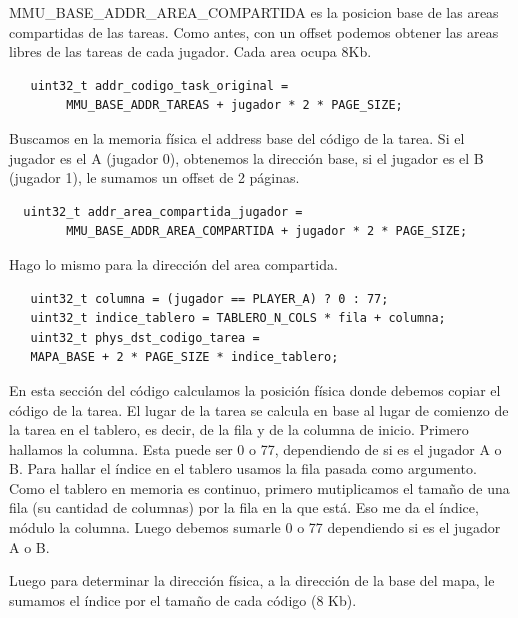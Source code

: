 \documentclass[a4paper]{article}
\newenvironment{codesnippet}{%
	\begin{Sbox}\begin{minipage}{\textwidth}\sffamily\small}%
	{\end{minipage}\end{Sbox}%
		\begin{center}%
		\vspace{-0.4cm}\colorbox{litegrey}{\TheSbox}\end{center}\vspace{0.3cm}}
\begin{document}
MMU\_BASE\_ADDR\_AREA\_COMPARTIDA es la posicion base de las areas compartidas de las tareas. Como antes, con un offset
podemos obtener las areas libres de las tareas de cada jugador. Cada area ocupa 8Kb.

\begin{codesnippet}
  \begin{verbatim}
   uint32_t addr_codigo_task_original =
        MMU_BASE_ADDR_TAREAS + jugador * 2 * PAGE_SIZE;
  \end{verbatim}
\end{codesnippet}

Buscamos en la memoria física el address base del código de la tarea. Si el jugador es el A (jugador 0), obtenemos la
dirección base, si el jugador es el B (jugador 1), le sumamos un offset de 2 páginas.

\begin{codesnippet}
  \begin{verbatim}
  uint32_t addr_area_compartida_jugador =
        MMU_BASE_ADDR_AREA_COMPARTIDA + jugador * 2 * PAGE_SIZE;
  \end{verbatim}
\end{codesnippet}

Hago lo mismo para la dirección del area compartida.

\begin{codesnippet}
  \begin{verbatim}
   uint32_t columna = (jugador == PLAYER_A) ? 0 : 77;
   uint32_t indice_tablero = TABLERO_N_COLS * fila + columna;
   uint32_t phys_dst_codigo_tarea = 
   MAPA_BASE + 2 * PAGE_SIZE * indice_tablero;
  \end{verbatim}
\end{codesnippet}

En esta sección del código calculamos la posición física donde debemos copiar el código de la tarea. El lugar de la
tarea se calcula en base al lugar de comienzo de la tarea en el tablero, es decir, de la fila y de la columna de inicio.
Primero hallamos la columna. Esta puede ser 0 o 77, dependiendo de si es el jugador A o B. Para hallar el índice en el
tablero usamos la fila pasada como argumento. Como el tablero en memoria es continuo, primero mutiplicamos el tamaño de
una fila (su cantidad de columnas) por la fila en la que está. Eso me da el índice, módulo la columna. Luego debemos
sumarle 0 o 77 dependiendo si es el jugador A o B.

Luego para determinar la dirección física, a la dirección de la base del mapa, le sumamos el índice por el tamaño de
cada código (8 Kb).
\end{document}
